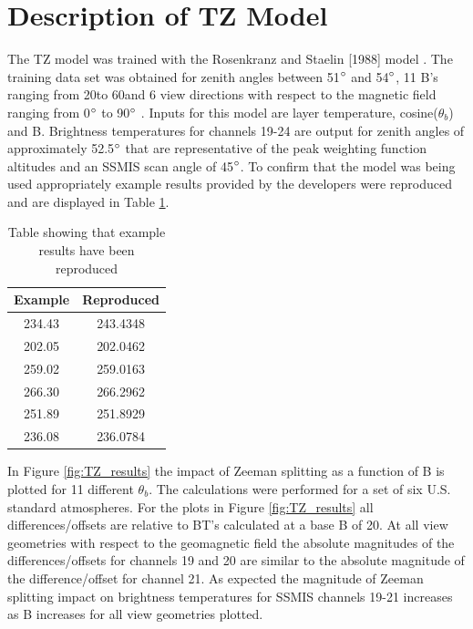 \section{Description of TZ Model}

The TZ model was trained with the Rosenkranz and Staelin [1988] model \cite{ref:Rosenkranz2}. The training data set was obtained for zenith angles between 51$^\circ$ and 54$^\circ$,
11 B's ranging from 20\microtesla to 60\microtesla and 6 view directions with respect to the magnetic field ranging from 0$^\circ$ to 90$^\circ$
\cite{ref:Han1}. Inputs for this model are layer temperature, cosine($\theta_{b}$) and B. Brightness temperatures for channels 19-24 are output for zenith angles of approximately
52.5$^\circ$ that are representative of the peak weighting function altitudes and an SSMIS scan angle of 45$^\circ$. To confirm that the model was being used appropriately example results provided
by the developers were reproduced and are displayed in Table \ref{tab:example_res}. 

\smallskip
\smallskip

\begin{table}[htp]
  \centering
  \begin{tabular}{c c}
    Example & Reproduced \\
    \hline 
    234.43 & 243.4348 \\
    202.05 & 202.0462 \\
    259.02 & 259.0163 \\
    266.30 & 266.2962 \\
    251.89 & 251.8929 \\
    236.08 & 236.0784 \\    
  \end{tabular}
  \caption{Table showing that example results have been reproduced}
  \label{tab:example_res}
\end{table}
 
\smallskip
\smallskip

In Figure \ref{fig:TZ_results} the impact of Zeeman splitting as a function of B is plotted for 11 different $\theta_{b}$. The calculations
were performed for a set of six U.S. standard atmospheres. 
For the plots in Figure \ref{fig:TZ_results} all differences/offsets are relative to BT's calculated
at a base B of 20\microtesla. At all view geometries with respect to 
the geomagnetic field the absolute magnitudes of the differences/offsets for channels 19 and 20
are similar to the absolute magnitude of the difference/offset for channel 21. As expected the 
magnitude of Zeeman splitting impact on brightness temperatures for SSMIS channels 19-21 increases   
as B increases for all view geometries plotted. 
 
